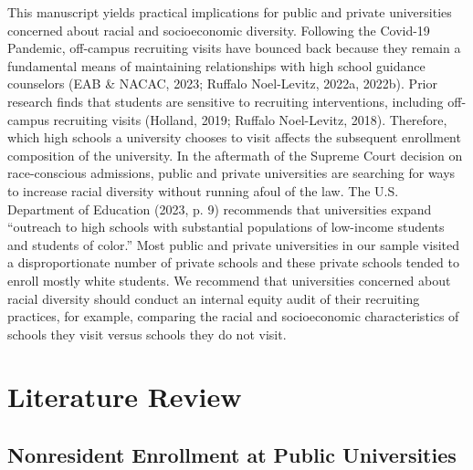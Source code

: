 \documentclass[
  12pt,
]{article}
\begin{document}
This manuscript yields practical implications for public and private universities concerned about racial and socioeconomic diversity. Following the Covid-19 Pandemic, off-campus recruiting visits have bounced back because they remain a fundamental means of maintaining relationships with high school guidance counselors (EAB \& NACAC, 2023; Ruffalo Noel-Levitz, 2022a, 2022b). Prior research finds that students are sensitive to recruiting interventions, including off-campus recruiting visits (Holland, 2019; Ruffalo Noel-Levitz, 2018). Therefore, which high schools a university chooses to visit affects the subsequent enrollment composition of the university. In the aftermath of the Supreme Court decision on race-conscious admissions, public and private universities are searching for ways to increase racial diversity without running afoul of the law. The U.S. Department of Education (2023, p. 9) recommends that universities expand ``outreach to high schools with substantial populations of low-income students and students of color.'' Most public and private universities in our sample visited a disproportionate number of private schools and these private schools tended to enroll mostly white students. We recommend that universities concerned about racial diversity should conduct an internal equity audit of their recruiting practices, for example, comparing the racial and socioeconomic characteristics of schools they visit versus schools they do not visit.

\hypertarget{literature-review}{%
\section{Literature Review}\label{literature-review}}

\hypertarget{nonresident-enrollment-at-public-universities}{%
\subsection{Nonresident Enrollment at Public Universities}\label{nonresident-enrollment-at-public-universities}}
\end{document}
